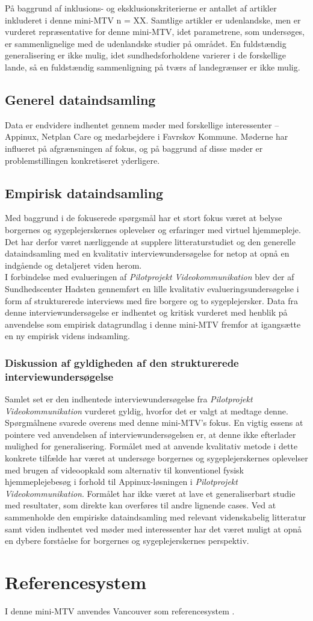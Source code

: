 På baggrund af inklusions- og eksklusionskriterierne er antallet af artikler inkluderet i denne mini-MTV n = XX. Samtlige artikler er udenlandske, men er vurderet repræsentative for denne mini-MTV, idet parametrene, som undersøges, er sammenlignelige med de udenlandske studier på området. En fuldstændig generalisering er ikke mulig, idet sundhedsforholdene varierer i de forskellige lande, så en fuldstændig sammenligning på tværs af landegrænser er ikke mulig. 

\subsection{Generel dataindsamling}
Data er endvidere indhentet gennem møder med forskellige interessenter – Appinux, Netplan Care og medarbejdere i Favrskov Kommune. Møderne har influeret på afgrænsningen af fokus, og på baggrund af disse møder er problemstillingen konkretiseret yderligere.

\subsection{Empirisk dataindsamling}
Med baggrund i de fokuserede spørgsmål har et stort fokus været at belyse borgernes og sygeplejerskernes oplevelser og erfaringer med virtuel hjemmepleje. Det har derfor været nærliggende at supplere litteraturstudiet og den generelle dataindsamling med en kvalitativ interviewundersøgelse for netop at opnå en indgående og detaljeret viden herom.\\
I forbindelse med evalueringen af \textit{Pilotprojekt Videokommunikation} blev der af Sundhedscenter Hadsten gennemført en lille kvalitativ evalueringsundersøgelse i form af strukturerede interviews med fire borgere og to sygeplejersker. Data fra denne interviewundersøgelse er indhentet og kritisk vurderet med henblik på anvendelse som empirisk datagrundlag i denne mini-MTV fremfor at igangsætte en ny empirisk videns indsamling.
\subsubsection{Diskussion af gyldigheden af den strukturerede interviewundersøgelse}
Samlet set er den indhentede interviewundersøgelse fra \textit{Pilotprojekt Videokommunikation} vurderet gyldig, hvorfor det er valgt at medtage denne. Spørgmålnene svarede overens med denne mini-MTV's fokus. En vigtig essens at pointere ved anvendelsen af interviewundersøgelsen er, at denne ikke efterlader mulighed for generalisering. Formålet med at anvende kvalitativ metode i dette konkrete tilfælde har været at undersøge borgernes og sygeplejerskernes oplevelser med brugen af videoopkald som alternativ til konventionel fysisk hjemmeplejebesøg i forhold til Appinux-løsningen i \textit{Pilotprojekt Videokommunikation}. Formålet har ikke været at lave et generaliserbart studie med resultater, som direkte kan overføres til andre lignende cases. Ved at sammenholde den empiriske dataindsamling med relevant videnskabelig litteratur samt viden indhentet ved møder med interessenter har det været muligt at opnå en dybere forståelse for borgernes og sygeplejerskernes perspektiv. 


\section{Referencesystem}
I denne mini-MTV anvendes Vancouver som referencesystem \cite{vancouver}.


  
	

